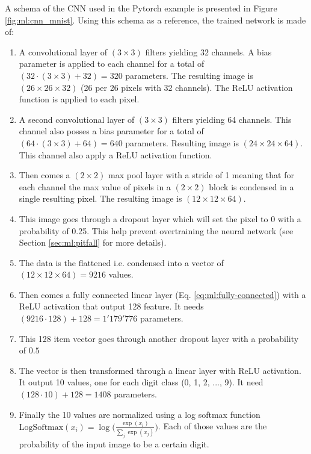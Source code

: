 \documentclass[../main.tex]{subfiles}
\begin{document}
A schema of the CNN used in the Pytorch example is presented in Figure \ref{fig:ml:cnn_mnist}. Using this schema as a reference, the trained network is made of:
\begin{enumerate}
  \item A convolutional layer of $(3 \times 3)$ filters yielding 32 channels. A bias parameter is applied to each channel for a total of $(32 \cdot (3\times3) + 32) = 320$ parameters. The resulting image is $(26\times26 \times 32)$ (26 per 26 pixels with 32 channels). The ReLU activation function is applied to each pixel.
  \item A second convolutional layer of $(3 \times 3)$ filters yielding 64 channels. This channel also posses a bias parameter for a total of $(64 \cdot (3\times3) + 64) = 640$ parameters. Resulting image is $(24\times24\times64)$. This channel also apply a ReLU activation function.
  \item Then comes a $(2\times2)$ max pool layer with a stride of 1 meaning that for each channel the max value of pixels in a $(2\times2)$ block is condensed in a single resulting pixel. The resulting image is $(12 \times 12 \times 64)$.
  \item This image goes through a dropout layer which will set the pixel to 0 with a probability of 0.25. This help prevent overtraining the neural network (see Section \ref{sec:ml:pitfall} for more details).
  \item The data is the flattened i.e. condensed into a vector of $(12 \times 12 \times 64) = 9216$ values.
  \item Then comes a fully connected linear layer (Eq. \ref{eq:ml:fully-connected}) with a ReLU activation that output 128 feature. It needs $(9216 \cdot 128)+ 128 = 1'179'776$ parameters.
  \item This 128 item vector goes through another dropout layer with a probability of $0.5$
  \item The vector is then transformed through a linear layer with ReLU activation. It output 10 values, one for each digit class (0, 1, 2, ..., 9). It need $(128 \cdot 10) + 128 = 1408$ parameters.
  \item Finally the 10 values are normalized using a log softmax function $\mathrm{LogSoftmax}(x_i) = \log \bigg(\frac{\exp(x_i)}{\sum_j \exp(x_j)}\bigg)$. Each of those values are the probability of the input image to be a certain digit.
\end{enumerate}
\end{document}
